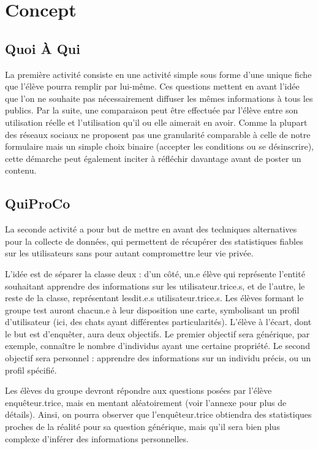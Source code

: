 \documentclass[a4paper]{article}
\begin{document}
\section*{Concept}

\subsection*{Quoi À Qui}

La première activité consiste en une activité simple sous forme d'une unique fiche que l'élève pourra remplir par lui-même.
Ces questions mettent en avant l'idée que l'on ne souhaite pas nécessairement diffuser les mêmes informations à tous les publics.
Par la suite, une comparaison peut être effectuée par l'élève entre son utilisation réelle et l'utilisation qu'il ou elle aimerait en avoir.
Comme la plupart des réseaux sociaux ne proposent pas une granularité comparable à celle de notre formulaire mais un simple choix binaire (accepter les conditions ou se désinscrire), cette démarche peut également inciter à réfléchir davantage avant de poster un contenu.

\subsection*{QuiProCo}

La seconde activité a pour but de mettre en avant des techniques alternatives pour la collecte de données, qui permettent de récupérer des statistiques fiables sur les utilisateurs sans pour autant compromettre leur vie privée.

L'idée est de séparer la classe deux : d'un côté, un.e élève qui représente l'entité souhaitant apprendre des informations sur les utilisateur.trice.s, et de l'autre, le reste de la classe, représentant lesdit.e.s utilisateur.trice.s.
Les élèves formant le groupe test auront chacun.e à leur disposition une carte, symbolisant un profil d'utilisateur (ici, des chats ayant différentes particularités).
L'élève à l'écart, dont le but est d'enquêter, aura deux objectifs. Le premier objectif sera générique, par exemple, connaître le nombre d'individus ayant une certaine propriété. Le second objectif sera personnel : apprendre des informations sur un individu précis, ou un profil spécifié.

Les élèves du groupe devront répondre aux questions posées par l'élève enquêteur.trice, mais en mentant aléatoirement (voir l'annexe pour plus de détails). Ainsi, on pourra observer que l'enquêteur.trice obtiendra des statistiques proches de la réalité pour sa question générique, mais qu'il sera bien plus complexe d'inférer des informations personnelles.
\end{document}
